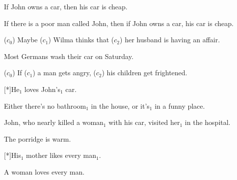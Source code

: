 \begin{exe}
   If John owns a car, then his car is cheap.
  \dotfill \pageref{ex:cancel}
\end{exe}

\begin{exe}
   If there is a poor man called John, then if
  John owns a car, his car is cheap.
  \dotfill \pageref{ex:john-presupposed}
\end{exe}

\begin{exe}
   ($c_0$) Maybe ($c_1$) Wilma thinks that ($c_2$) her
  husband is having an affair.
  \dotfill \pageref{ex:wilma}
\end{exe}

\begin{exe}
   Most Germans wash their car on Saturday.
  \dotfill \pageref{ex:most-germans-wash}
\end{exe}

\begin{exe}
   ($c_0$) If ($c_1$) a man gets angry, ($c_2$) his
  children get frightened.
  \dotfill \pageref{ex:man-angry}
\end{exe}

\begin{exe}
  [*]{He$_1$ loves John's$_1$ car.
  \dotfill \pageref{ex:cataphora}}
\end{exe}

\begin{exe}
   Either there's no bathroom$_1$ in the house, or
  it's$_1$ in a funny place.
  \dotfill \pageref{ex:bathroom}
\end{exe}

\begin{exe}
   John, who nearly killed a woman$_1$ with his car,
  visited her$_1$ in the hospital.
  \dotfill \pageref{ex:hospital}
\end{exe}

\begin{exe}
   The porridge is warm.
  \dotfill \pageref{ex:porridge}
\end{exe}

\begin{exe}
  [*]{His$_1$ mother likes every man$_1$.
  \dotfill \pageref{ex:crossover}}
\end{exe}

\begin{exe}
   A woman loves every man.
  \dotfill \pageref{ex:inverse}
\end{exe}

